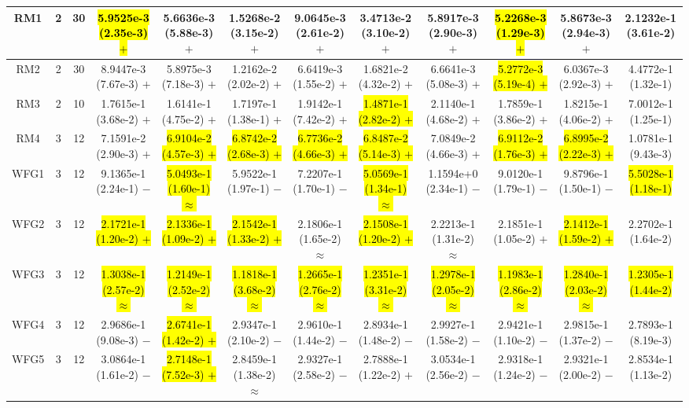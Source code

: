 \documentclass[journal]{IEEEtran}
\begin{document}
\begin{table*}[htbp]
\begin{tabular}{cccccccccccc}
\hline
\multirow{1}{*}{RM1}&2&30&\hl{5.9525e-3 (2.35e-3) $+$}&5.6636e-3 (5.88e-3) $+$&1.5268e-2 (3.15e-2) $+$&9.0645e-3 (2.61e-2) $+$&3.4713e-2 (3.10e-2) $+$&5.8917e-3 (2.90e-3) $+$&\hl{5.2268e-3 (1.29e-3) $+$}&5.8673e-3 (2.94e-3) $+$&2.1232e-1 (3.61e-2)\\
\hline
\multirow{1}{*}{RM2}&2&30&8.9447e-3 (7.67e-3) $+$&5.8975e-3 (7.18e-3) $+$&1.2162e-2 (2.02e-2) $+$&6.6419e-3 (1.55e-2) $+$&1.6821e-2 (4.32e-2) $+$&6.6641e-3 (5.08e-3) $+$&\hl{5.2772e-3 (5.19e-4) $+$}&6.0367e-3 (2.92e-3) $+$&4.4772e-1 (1.32e-1)\\
\hline
\multirow{1}{*}{RM3}&2&10&1.7615e-1 (3.68e-2) $+$&1.6141e-1 (4.75e-2) $+$&1.7197e-1 (1.38e-1) $+$&1.9142e-1 (7.42e-2) $+$&\hl{1.4871e-1 (2.82e-2) $+$}&2.1140e-1 (4.68e-2) $+$&1.7859e-1 (3.86e-2) $+$&1.8215e-1 (4.06e-2) $+$&7.0012e-1 (1.25e-1)\\
\hline
\multirow{1}{*}{RM4}&3&12&7.1591e-2 (2.90e-3) $+$&\hl{6.9104e-2 (4.57e-3) $+$}&\hl{6.8742e-2 (2.68e-3) $+$}&\hl{6.7736e-2 (4.66e-3) $+$}&\hl{6.8487e-2 (5.14e-3) $+$}&7.0849e-2 (4.66e-3) $+$&\hl{6.9112e-2 (1.76e-3) $+$}&\hl{6.8995e-2 (2.22e-3) $+$}&1.0781e-1 (9.43e-3)\\
\hline
\multirow{1}{*}{WFG1}&3&12&9.1365e-1 (2.24e-1) $-$&\hl{5.0493e-1 (1.60e-1) $\approx$}&5.9522e-1 (1.97e-1) $-$&7.2207e-1 (1.70e-1) $-$&\hl{5.0569e-1 (1.34e-1) $\approx$}&1.1594e+0 (2.34e-1) $-$&9.0120e-1 (1.79e-1) $-$&9.8796e-1 (1.50e-1) $-$&\hl{5.5028e-1 (1.18e-1)}\\
\hline
\multirow{1}{*}{WFG2}&3&12&\hl{2.1721e-1 (1.20e-2) $+$}&\hl{2.1336e-1 (1.09e-2) $+$}&\hl{2.1542e-1 (1.33e-2) $+$}&2.1806e-1 (1.65e-2) $\approx$&\hl{2.1508e-1 (1.20e-2) $+$}&2.2213e-1 (1.31e-2) $\approx$&2.1851e-1 (1.05e-2) $+$&\hl{2.1412e-1 (1.59e-2) $+$}&2.2702e-1 (1.64e-2)\\
\hline
\multirow{1}{*}{WFG3}&3&12&\hl{1.3038e-1 (2.57e-2) $\approx$}&\hl{1.2149e-1 (2.52e-2) $\approx$}&\hl{1.1818e-1 (3.68e-2) $\approx$}&\hl{1.2665e-1 (2.76e-2) $\approx$}&\hl{1.2351e-1 (3.31e-2) $\approx$}&\hl{1.2978e-1 (2.05e-2) $\approx$}&\hl{1.1983e-1 (2.86e-2) $\approx$}&\hl{1.2840e-1 (2.03e-2) $\approx$}&\hl{1.2305e-1 (1.44e-2)}\\
\hline
\multirow{1}{*}{WFG4}&3&12&2.9686e-1 (9.08e-3) $-$&\hl{2.6741e-1 (1.42e-2) $+$}&2.9347e-1 (2.10e-2) $-$&2.9610e-1 (1.44e-2) $-$&2.8934e-1 (1.48e-2) $-$&2.9927e-1 (1.58e-2) $-$&2.9421e-1 (1.10e-2) $-$&2.9815e-1 (1.37e-2) $-$&2.7893e-1 (8.19e-3)\\
\hline
\multirow{1}{*}{WFG5}&3&12&3.0864e-1 (1.61e-2) $-$&\hl{2.7148e-1 (7.52e-3) $+$}&2.8459e-1 (1.38e-2) $\approx$&2.9327e-1 (2.58e-2) $-$&2.7888e-1 (1.22e-2) $+$&3.0534e-1 (2.56e-2) $-$&2.9318e-1 (1.24e-2) $-$&2.9321e-1 (2.00e-2) $-$&2.8534e-1 (1.13e-2)\\

\end{tabular}
\end{table*}
\end{document}
